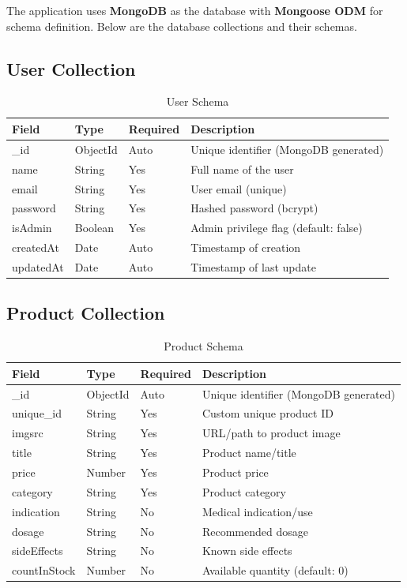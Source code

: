 \documentclass[12pt,a4paper]{article}
\begin{document}
The application uses \textbf{MongoDB} as the database with \textbf{Mongoose ODM} for schema definition. Below are the database collections and their schemas.

\subsection{User Collection}

\begin{table}[h!]
\centering
\begin{tabular}{@{}llll@{}}
\toprule
\textbf{Field} & \textbf{Type} & \textbf{Required} & \textbf{Description} \\
\midrule
\_id & ObjectId & Auto & Unique identifier (MongoDB generated) \\
name & String & Yes & Full name of the user \\
email & String & Yes & User email (unique) \\
password & String & Yes & Hashed password (bcrypt) \\
isAdmin & Boolean & Yes & Admin privilege flag (default: false) \\
createdAt & Date & Auto & Timestamp of creation \\
updatedAt & Date & Auto & Timestamp of last update \\
\bottomrule
\end{tabular}
\caption{User Schema}
\end{table}

\subsection{Product Collection}

\begin{table}[h!]
\centering
\begin{tabular}{@{}llll@{}}
\toprule
\textbf{Field} & \textbf{Type} & \textbf{Required} & \textbf{Description} \\
\midrule
\_id & ObjectId & Auto & Unique identifier (MongoDB generated) \\
unique\_id & String & Yes & Custom unique product ID \\
imgsrc & String & Yes & URL/path to product image \\
title & String & Yes & Product name/title \\
price & Number & Yes & Product price \\
category & String & Yes & Product category \\
indication & String & No & Medical indication/use \\
dosage & String & No & Recommended dosage \\
sideEffects & String & No & Known side effects \\
countInStock & Number & No & Available quantity (default: 0) \\
\bottomrule
\end{tabular}
\caption{Product Schema}
\end{table}
\end{document}
